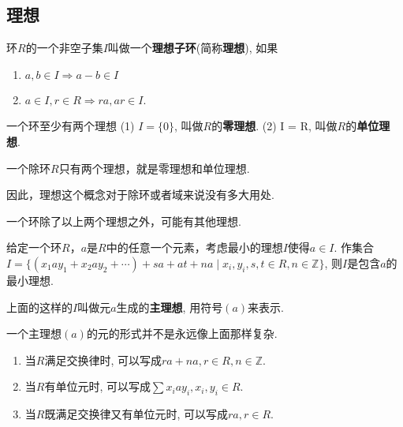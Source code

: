 \subsection{理想} %

\begin{Definition}[!理想]
环$R$的一个非空子集$I$叫做一个\textbf{理想子环}(简称\textbf{理想}), 如果
\begin{enumerate}
	\item $a, b \in I \Rightarrow a - b \in I$
	\item $a \in I, r \in R \Rightarrow ra, ar \in I$.
\end{enumerate}
\end{Definition}

\begin{Proposition}
一个环至少有两个理想 (1) $I = \{\mathfrak{0}\}$, 叫做$R$的\textbf{零理想}.
(2) I = R, 叫做$R$的\textbf{单位理想}.
\end{Proposition}

\begin{Theorem}
一个除环$R$只有两个理想，就是零理想和单位理想.
\end{Theorem}

\begin{Note}
因此，理想这个概念对于除环或者域来说没有多大用处.
\end{Note}

\begin{Note}
一个环除了以上两个理想之外，可能有其他理想.
\end{Note}

\begin{Proposition}
给定一个环$R$，$a$是$R$中的任意一个元素，考虑最小的理想$I$使得$a \in I$. 作集合
$I = \{ \left( x_1 a y_1 + x_2 a y_2 + \cdots \right) + s a + a t + na \mid
x_i, y_i, s, t \in R, n \in \mathbb{Z} \}$, 则$I$是包含$a$的最小理想.
\end{Proposition}

\begin{Definition}[主理想]
上面的这样的$I$叫做元$a$生成的\textbf{主理想}, 用符号$(a)$来表示.
\end{Definition}

\begin{Note}
一个主理想$(a)$的元的形式并不是永远像上面那样复杂.
\begin{enumerate}
	\item 当$R$满足交换律时, 可以写成$ra + na, r \in R, n \in \mathbb{Z}$.
	\item 当$R$有单位元时, 可以写成$ \displaystyle \sum x_i a y_i, x_i, y_i \in R $.

	\item 当$R$既满足交换律又有单位元时, 可以写成$ \displaystyle ra, r \in R $.
\end{enumerate}
\end{Note}

